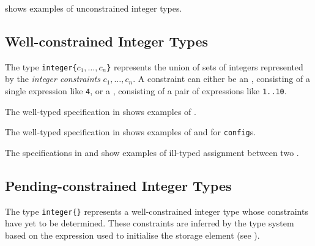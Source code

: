  shows examples of unconstrained integer types.

\subsection{Well-constrained Integer Types}
%
The type \texttt{integer\{$c_1,\ldots,c_n$\}} represents the
union of sets of integers represented by the \emph{integer constraints} $c_1,\ldots,c_n$.
\hypertarget{def-exactconstraintterm}{}
\hypertarget{def-rangeconstraintterm}{}
A constraint can either be an \emph{\exactconstraintterm}, consisting of a single expression like \texttt{4},
or a \emph{\rangeconstraintterm}, consisting of a pair of expressions like \texttt{1..10}.

\hypertarget{def-wellconstrainedintegertype}{}
The well-typed specification in  shows examples of \wellconstrainedintegertypesterm.

The well-typed specification in  shows examples of \wellconstrainedintegertypesterm{}
and \unconstrainedintegertypesterm{} for \verb|config|s.

The specifications in 
and 
show examples of ill-typed
assignment between two \wellconstrainedintegertypesterm{}.

\subsection{Pending-constrained Integer Types}
\hypertarget{def-pendingconstrainedintegertype}{}
The type \verb|integer{}| represents a well-constrained integer type whose
constraints have yet to be determined.
These constraints are inferred by the type system based on the expression used to initialise
the storage element (see ).

